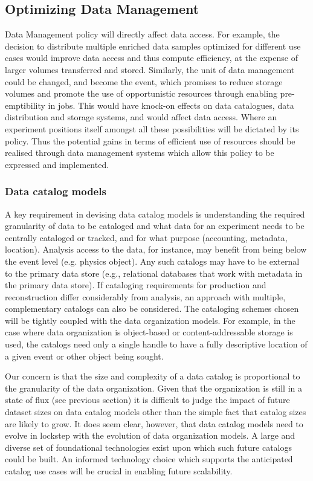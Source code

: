 \documentclass[12pt,a4paper]{article}
\begin{document}
\subsection{Optimizing Data Management
}\label{optimizing-data-management}

Data Management policy will directly affect data access. For example,
the decision to distribute multiple enriched data samples optimized for
different use cases would improve data access and thus compute
efficiency, at the expense of larger volumes transferred and stored.
Similarly, the unit of data management could be changed, and become the
event, which promises to reduce storage volumes and promote the use of
opportunistic resources through enabling pre-emptibility in jobs. This
would have knock-on effects on data catalogues, data distribution and
storage systems, and would affect data access. Where an experiment
positions itself amongst all these possibilities will be dictated by its
policy. Thus the potential gains in terms of efficient use of resources
should be realised through data management systems which allow this
policy to be expressed and implemented.

\subsubsection{Data catalog models}\label{data-catalog-models}

A key requirement in devising data catalog models is understanding the
required granularity of data to be cataloged and what data for an
experiment needs to be centrally cataloged or tracked, and for what
purpose (accounting, metadata, location). Analysis access to the data,
for instance, may benefit from being below the event level (e.g. physics
object). Any such catalogs may have to be external to the primary data
store (e.g., relational databases that work with metadata in the primary
data store). If cataloging requirements for production and
reconstruction differ considerably from analysis, an approach with
multiple, complementary catalogs can also be considered. The cataloging
schemes chosen will be tightly coupled with the data organization
models. For example, in the case where data organization is object-based
or content-addressable storage is used, the catalogs need only a single
handle to have a fully descriptive location of a given event or other
object being sought.

Our concern is that the size and complexity of a data catalog is
proportional to the granularity of the data organization. Given that the
organization is still in a state of flux (see previous section) it is
difficult to judge the impact of future dataset sizes on data catalog
models other than the simple fact that catalog sizes are likely to grow.
It does seem clear, however, that data catalog models need to evolve in
lockstep with the evolution of data organization models. A large and
diverse set of foundational technologies exist upon which such future
catalogs could be built. An informed technology choice which supports
the anticipated catalog use cases will be crucial in enabling future
scalability.
\end{document}

